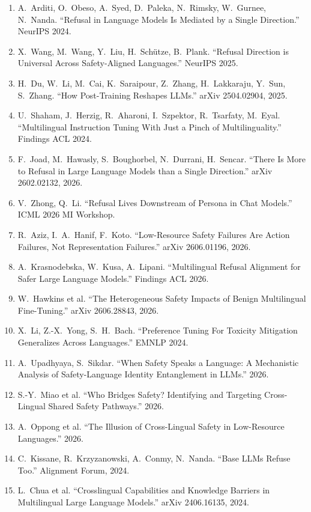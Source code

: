 \documentclass[11pt,letterpaper]{article}
\begin{document}
{\small
\begin{enumerate}
\item A.~Arditi, O.~Obeso, A.~Syed, D.~Paleka, N.~Rimsky, W.~Gurnee, N.~Nanda. ``Refusal in Language Models Is Mediated by a Single Direction.'' NeurIPS 2024.
\item X.~Wang, M.~Wang, Y.~Liu, H.~Sch\"utze, B.~Plank. ``Refusal Direction is Universal Across Safety-Aligned Languages.'' NeurIPS 2025.
\item H.~Du, W.~Li, M.~Cai, K.~Saraipour, Z.~Zhang, H.~Lakkaraju, Y.~Sun, S.~Zhang. ``How Post-Training Reshapes LLMs.'' arXiv 2504.02904, 2025.
\item U.~Shaham, J.~Herzig, R.~Aharoni, I.~Szpektor, R.~Tsarfaty, M.~Eyal. ``Multilingual Instruction Tuning With Just a Pinch of Multilinguality.'' Findings ACL 2024.
\item F.~Joad, M.~Hawasly, S.~Boughorbel, N.~Durrani, H.~Sencar. ``There Is More to Refusal in Large Language Models than a Single Direction.'' arXiv 2602.02132, 2026.
\item V.~Zhong, Q.~Li. ``Refusal Lives Downstream of Persona in Chat Models.'' ICML 2026 MI Workshop.
\item R.~Aziz, I.~A.~Hanif, F.~Koto. ``Low-Resource Safety Failures Are Action Failures, Not Representation Failures.'' arXiv 2606.01196, 2026.
\item A.~Krasnodebska, W.~Kusa, A.~Lipani. ``Multilingual Refusal Alignment for Safer Large Language Models.'' Findings ACL 2026.
\item W.~Hawkins et al. ``The Heterogeneous Safety Impacts of Benign Multilingual Fine-Tuning.'' arXiv 2606.28843, 2026.
\item X.~Li, Z.-X.~Yong, S.~H.~Bach. ``Preference Tuning For Toxicity Mitigation Generalizes Across Languages.'' EMNLP 2024.
\item A.~Upadhyaya, S.~Sikdar. ``When Safety Speaks a Language: A Mechanistic Analysis of Safety-Language Identity Entanglement in LLMs.'' 2026.
\item S.-Y.~Miao et al. ``Who Bridges Safety? Identifying and Targeting Cross-Lingual Shared Safety Pathways.'' 2026.
\item A.~Oppong et al. ``The Illusion of Cross-Lingual Safety in Low-Resource Languages.'' 2026.
\item C.~Kissane, R.~Krzyzanowski, A.~Conmy, N.~Nanda. ``Base LLMs Refuse Too.'' Alignment Forum, 2024.
\item L.~Chua et al. ``Crosslingual Capabilities and Knowledge Barriers in Multilingual Large Language Models.'' arXiv 2406.16135, 2024.

\end{enumerate}}
\end{document}
